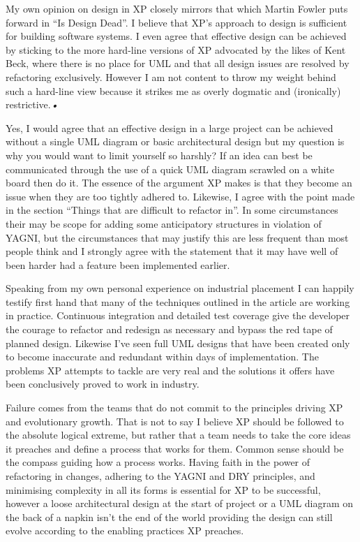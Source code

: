\documentclass[paper=a4, fontsize=11pt]{scrartcl}	%
\numberwithin{equation}{section}															%
\numberwithin{figure}{section}																%
\numberwithin{table}{section}
\begin{document}
My own opinion on design in XP closely mirrors that which Martin Fowler puts forward in ``Is Design Dead''. I believe that XP's approach to design is sufficient for building software systems. I even agree that effective design can be achieved by sticking to the more hard-line versions of XP advocated by the likes of Kent Beck, where there is no place for UML and that all design issues are resolved by refactoring exclusively. However I am not content to throw my weight behind such a hard-line view because it strikes me as overly dogmatic and (ironically) restrictive.\textsl{•}

Yes, I would agree that an effective design in a large project can be achieved without a single UML diagram or basic architectural  design but my question is why you would want to limit yourself so harshly? If an idea can best be communicated through the use of a quick UML diagram scrawled on a white board then do it. The essence of the argument XP makes is that they become an issue when they are too tightly adhered to. Likewise, I agree with the point made in the section ``Things that are difficult to refactor in''. In some circumstances their may be scope for adding some anticipatory structures in violation of YAGNI, but the circumstances that may justify this are less frequent than most people think and I strongly agree with the statement that it may have well of been harder had a feature been implemented earlier.

Speaking from my own personal experience on industrial placement I can happily testify first hand that many of the techniques outlined in the article are working in practice. Continuous integration and detailed test coverage give the developer the courage to refactor and redesign as necessary and bypass the red tape of planned design. Likewise I've seen full UML designs that have been created only to become inaccurate and redundant within days of implementation. The problems XP attempts to tackle are very real and the solutions it offers have been conclusively proved to work in industry. 

Failure comes from the teams that do not commit to the principles driving XP and evolutionary growth. That is not to say I believe XP should be followed to the absolute logical extreme, but rather that a team needs to take the core ideas it preaches and define a process that works for them. Common sense should be the compass guiding how a process works. Having faith in the power of refactoring in changes, adhering to the YAGNI and DRY principles, and minimising complexity in all its forms is essential for XP to be successful, however a loose architectural design at the start of project or a UML diagram on the back of a napkin isn't the end of the world providing the design can still evolve according to the enabling practices XP preaches.
\end{document}
